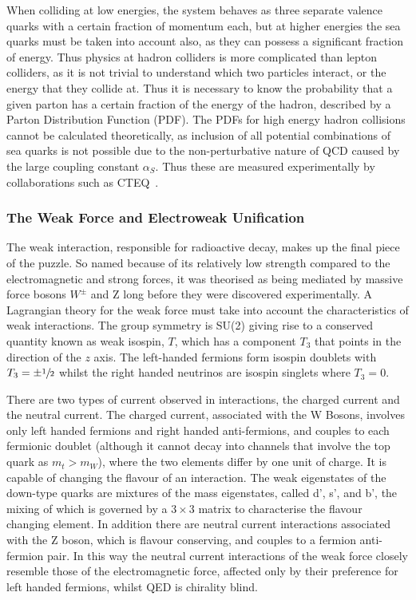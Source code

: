 When colliding at low energies, the system behaves as three separate valence quarks with a certain fraction of momentum each, but at higher energies the sea quarks must be taken into account also, as they can possess a significant fraction of energy.  Thus physics at hadron colliders is more complicated than lepton colliders, as it is not trivial to understand which two particles interact, or the energy that they collide at. Thus it is necessary to know the probability that a given parton has a certain fraction of the energy of the hadron,  described by a Parton Distribution Function (PDF). The PDFs for high energy hadron collisions cannot be calculated theoretically, as inclusion of all potential combinations of sea quarks is not possible due to the non-perturbative nature of QCD caused by the large coupling constant $\alpha_{S}$. Thus these are measured experimentally by collaborations such as CTEQ~\cite{CTEQ}. 
 


\subsubsection{The Weak Force and Electroweak Unification}

The weak interaction, responsible for radioactive decay, makes up the final piece of the puzzle. So named because of its relatively low strength compared to the electromagnetic and strong forces, it was theorised as being mediated by massive force bosons $W^{\pm}$ and Z long before they were discovered experimentally. A Lagrangian theory for the weak force must take into account the characteristics of weak interactions. The group symmetry is SU(2) giving rise to a conserved quantity known as weak isospin, $T$, which has a component $T_{3}$ that points in the direction of the $z$ axis. The left-handed fermions form isospin doublets with $T_{3} = \pm \sfrac{1}{2}$ whilst the right handed neutrinos are isospin singlets where $T_{3} = 0$.

There are two types of current observed in interactions, the charged current and the neutral current\cite{PichSM}. The charged current, associated with the W Bosons, involves only left handed fermions and right handed anti-fermions, and couples to each fermionic doublet (although it cannot decay into channels that involve the top quark as $m_{t} > m_{W}$), where the two elements differ by one unit of charge. It is capable of changing the flavour of an interaction. The weak eigenstates of the down-type quarks are mixtures of the mass eigenstates, called d', s', and b', the mixing of which is governed by a $3\times 3$ matrix to characterise the flavour changing element.  In addition there are neutral current interactions associated with the Z boson, which is flavour conserving, and couples to a fermion anti-fermion pair. In this way the neutral current interactions of the weak force closely resemble those of the electromagnetic force, affected only by their preference for left handed fermions, whilst QED is chirality blind. 

